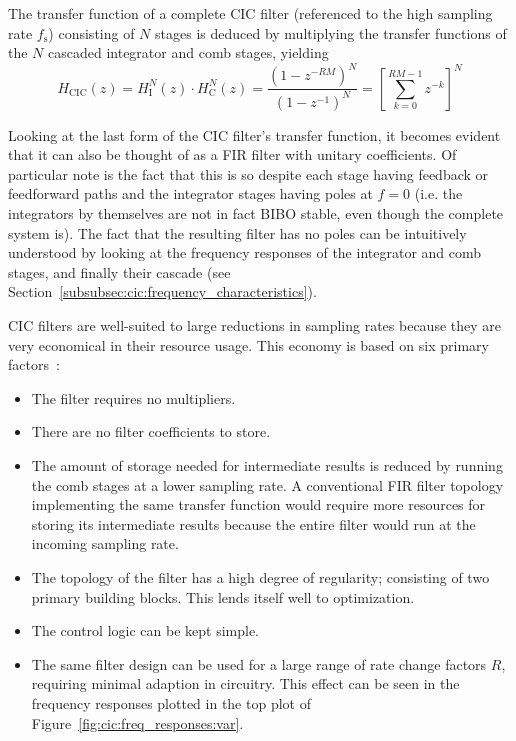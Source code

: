 The  transfer function  of  a  complete CIC  filter  (referenced  to the  high
sampling  rate  $f_\mathrm{s}$)  consisting  of   $N$  stages  is  deduced  by
multiplying the  transfer functions  of the $N$  cascaded integrator  and comb
stages, yielding
\begin{equation}
    \label{eq:cic:complete}
    H_\mathrm{CIC}(z) = H_\mathrm{I}^N(z) \cdot H_\mathrm{C}^N(z) =
    \frac{\left(1 - z^{-RM}\right)^N}{\left( 1 - z^{-1} \right)^N} =
    \left[\sum_{k = 0}^{RM-1} z^{-k}\right]^N
\end{equation}

Looking at  the last form  of the CIC  filter's transfer function,  it becomes
evident  that  it  can also  be  thought  of  as  a FIR  filter  with  unitary
coefficients. Of particular  note is  the fact  that this  is so  despite each
stage having  feedback or feedforward  paths and the integrator  stages having
poles at  $f = 0$  (i.e. the  integrators by themselves  are not in  fact BIBO
stable,  even though  the complete  system  is). The fact  that the  resulting
filter has no poles can be  intuitively understood by looking at the frequency
responses of  the integrator and comb  stages, and finally their  cascade (see
Section~\ref{subsubsec:cic:frequency_characteristics}).

CIC filters are well-suited to large reductions in sampling rates because they
are very  economical in  their resource  usage. This economy  is based  on six
primary factors~\cite{1163535}:
\begin{itemize}\tightlist
    \item
        The filter requires no multipliers.
    \item
        There are no filter coefficients to store.
    \item
        The amount  of storage needed  for intermediate results is  reduced by
        running the comb  stages at a lower sampling  rate. A conventional FIR
        filter topology implementing the  same transfer function would require
        more resources for storing its intermediate results because the entire
        filter would run at the incoming sampling rate.
    \item
        The  topology  of  the  filter   has  a  high  degree  of  regularity;
        consisting of two  primary building blocks. This lends  itself well to
        optimization.
    \item
        The control logic can be kept simple.
    \item
        The same filter  design can be used  for a large range  of rate change
        factors $R$, requiring minimal  adaption in circuitry. This effect can
        be  seen  in the  frequency  responses  plotted  in  the top  plot  of
        Figure~\ref{fig:cic:freq_responses:var}.
\end{itemize}

